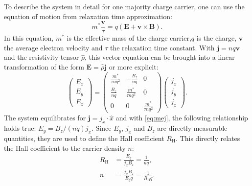 To describe the system in detail for one majority charge carrier, one can use the 
equation of motion from relaxation time approximation:
\begin{equation}
	m^{*} \frac{\mathbf{v}}{\tau}=q(\mathbf{E}
	+\mathbf{v}\times \mathbf{B}).
\end{equation}
In this equation, $m^{*}$ is the effective mass of the charge carrier,$q$ is the charge, 
$\mathbf{v}$ the average electron velocity and $\tau$ the relaxation time constant.
With $\mathbf{j}=nq\mathbf{v}$ and the resistivity tensor $\hat{\rho}$, 
this vector equation can be brought into a linear transformation of the form
$\mathbf{E}=\hat{\rho}\mathbf{j}$ or more explicit:
\begin{equation}
	\label{eq:mej}
	\begin{pmatrix}
		E_{x} \\
		E_{y} \\
		E_{z}
	\end{pmatrix}
	=
	\begin{pmatrix}
		\frac{m^{*}}{\tau nq^{2}} & - \frac{B_{z}}{nq}        & 0                         \\
		\frac{B_{z}}{nq}          & \frac{m^{*}}{\tau nq^{2}} & 0                         \\
		0                         & 0                         & \frac{m^{*}}{\tau nq^{2}}
	\end{pmatrix}
	\begin{pmatrix}
		j_{x} \\
		j_{y} \\
		j_{z}
	\end{pmatrix}.
\end{equation}
The system equilibrates for $\mathbf{j} = j_x \cdot \hat{x}$ and with \cref{eq:mej}, the following
relationship holds true: $E_{y} = B_{z} / (nq) j_{x}$.
Since $E_y$, $j_x$ and $B_z$ are directly measurable quantities,
they are used to define the Hall coefficient $R_{\mathrm{H}}$.
This directly relates the Hall coefficient to the carrier density $n$:
\begin{align}
	R_{\mathrm{H}}&=\frac{E_{y}}{j_{x}B_{z}}=\frac{1}{nq},
	\label{eq:hall_coefficient} \\
	n&=\frac{j_{x}B_{z}}{E_{y}q} = \frac{1}{R_{\mathrm{H}}q}.
	\label{eq:hall_concentration}
\end{align}

